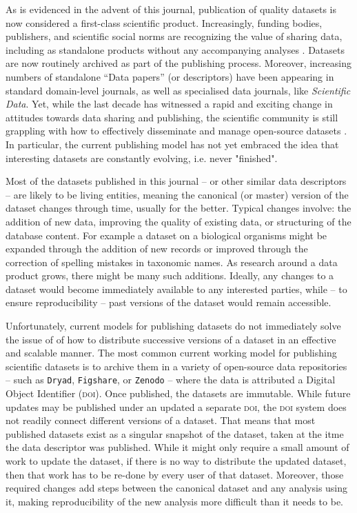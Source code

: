 \documentclass[a4paper,11pt]{article}
\begin{document}
As is evidenced in the advent of this journal, publication of quality datasets is now considered a first-class scientific product. Increasingly, funding bodies, publishers, and scientific social norms are recognizing the value of sharing data, including as standalone products without any accompanying analyses \cite[e.g.][]{Whitlock-2011,Fairbairn-2011,Piwowar-2011,VanNoorden-2013,Gibney-2013,Editorial-2014}. Datasets are now routinely archived as part of the publishing process. Moreover, increasing numbers of standalone ``Data papers'' (or descriptors) have been appearing in standard domain-level journals, as well as specialised data journals, like \emph{Scientific Data}. Yet, while the last decade has witnessed a rapid and exciting change in attitudes towards data sharing and publishing, the scientific community is still grappling with how to effectively disseminate and manage open-source datasets \cite{Whitlock-2011, Goodman-2014, Lowndes-2017,Perkel-2016,VanNoorden-2013, Kratz-2015}. In particular, the current publishing model has not yet embraced the idea that interesting datasets are constantly evolving, i.e. never "finished".

Most of the datasets published in this journal -- or other similar data descriptors -- are likely to be living entities, meaning the canonical (or master) version of the dataset changes through time, usually for the better. Typical changes involve: the addition of new data, improving the quality of existing data, or structuring of the database content. For example a dataset on a biological organisms might be expanded through the addition of new records or improved through the correction of spelling mistakes in taxonomic names. As research around a data product grows, there might be many such additions. Ideally, any changes to a dataset would become immediately available to any interested parties, while -- to ensure reproducibility -- past versions of the dataset would remain accessible.

Unfortunately, current models for publishing datasets do not immediately solve the issue of of how to distribute successive versions of a dataset in an effective and scalable manner. The most common current working model for publishing scientific datasets is to archive them in a variety of open-source data repositories -- such as \texttt{Dryad}, \texttt{Figshare}, or \texttt{Zenodo} -- where the data is attributed a Digital Object Identifier (\textsc{doi}). Once published, the datasets are immutable. While future updates may be published under an updated a separate \textsc{doi}, the \textsc{doi} system does not readily connect different versions of a dataset. That means that most published datasets exist as a singular snapshot of the dataset, taken at the itme the data descriptor was published. While it might only require a small amount of work to update the dataset, if there is no way to distribute the updated dataset, then that work has to be re-done by every user of that dataset. Moreover, those required changes add steps between the canonical dataset and any analysis using it, making reproducibility of the new analysis more difficult than it needs to be.
\end{document}

